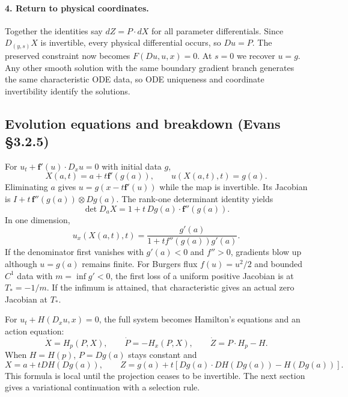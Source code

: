 \begin{expandedproof}
\paragraph{4. Return to physical coordinates.}
Together the identities say $dZ=P\cdot dX$ for all parameter
differentials. Since $D_{(y,s)}X$ is invertible, every physical
differential occurs, so $Du=P$.
The preserved constraint now becomes $F(Du,u,x)=0$.
At $s=0$ we recover $u=g$. Any other smooth solution with the same
boundary gradient branch generates the same characteristic ODE data,
so ODE uniqueness and coordinate invertibility identify the solutions.
\end{expandedproof}
\Needspace{45mm}

\subsection{Evolution equations and breakdown (Evans \S3.2.5)}
For $u_t+\mathbf f'(u)\cdot D_xu=0$ with initial data $g$,
\[
 X(a,t)=a+t\mathbf f'(g(a)),\qquad u(X(a,t),t)=g(a).
\]
Eliminating $a$ gives $u=g(x-t\mathbf f'(u))$ while the map is invertible.
Its Jacobian is $I+t\,\mathbf f''(g(a))\otimes Dg(a)$.
The rank-one determinant identity yields
\[
 \det D_aX=1+t\,Dg(a)\cdot\mathbf f''(g(a)).
\]
In one dimension,
\[
 u_x(X(a,t),t)=\frac{g'(a)}
                    {1+t f''(g(a))g'(a)}.
\]
If the denominator first vanishes with $g'(a)<0$ and $f''>0$,
gradients blow up although $u=g(a)$ remains finite.
For Burgers flux $f(u)=u^2/2$ and bounded $C^1$ data with
$m=\inf g'<0$, the first loss of a uniform positive Jacobian is at
$T_*=-1/m$. If the infimum is attained, that characteristic gives
an actual zero Jacobian at $T_*$.
\Needspace{45mm}

For $u_t+H(D_xu,x)=0$, the full system becomes Hamilton's equations
and an action equation:
\[
 \dot X=H_p(P,X),\qquad
 \dot P=-H_x(P,X),\qquad
 \dot Z=P\cdot H_p-H.
\]
When $H=H(p)$, $P=Dg(a)$ stays constant and
\[
 X=a+tDH(Dg(a)),\qquad
 Z=g(a)+t[Dg(a)\cdot DH(Dg(a))-H(Dg(a))].
\]
This formula is local until the projection ceases to be invertible.
The next section gives a variational continuation with a selection rule.

